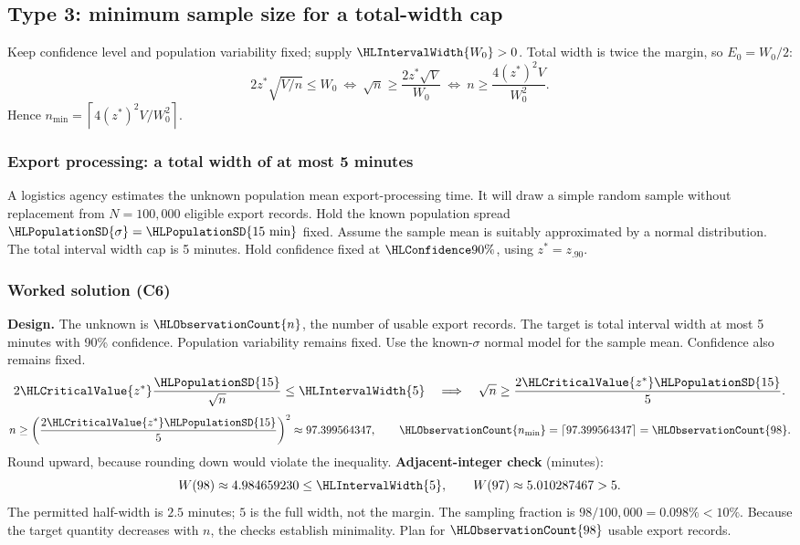 \clearpage
\subsection{Type 3: minimum sample size for a total-width cap}\label{prob:t3}
Keep confidence level and population variability fixed; supply $\HLIntervalWidth{W_0}>0$. Total width is twice the margin, so $E_0=W_0/2$:
\[
2z^*\sqrt{V/n}\le W_0
\ \Longleftrightarrow\ \sqrt n\ge\frac{2z^*\sqrt V}{W_0}
\ \Longleftrightarrow\ n\ge\frac{4(z^*)^2V}{W_0^2}.
\]
Hence $n_{\min}=\left\lceil4(z^*)^2V/W_0^2\right\rceil$.
\medskip
\subsubsection{Export processing: a total width of at most 5 minutes}\label{prob:t3-mean}
A logistics agency estimates the unknown population mean export-processing time. It will draw a simple random sample without replacement from $N=100{,}000$ eligible export records. Hold the known population spread $\HLPopulationSD{\sigma}=\HLPopulationSD{15\text{ min}}$ fixed. Assume the sample mean is suitably approximated by a normal distribution. The total interval width cap is 5 minutes. Hold confidence fixed at $\HLConfidence{90\%}$, using $z^*=z_{.90}$. 
\subsubsection*{Worked solution (C6)}\label{sol:t3-mean}
\textbf{Design.} The unknown is $\HLObservationCount{n}$, the number of usable export records. The target is total interval width at most 5 minutes with 90\% confidence. Population variability remains fixed. Use the known-$\sigma$ normal model for the sample mean. Confidence also remains fixed. 
\[
2\HLCriticalValue{z^*}\frac{\HLPopulationSD{15}}{\sqrt n}\le \HLIntervalWidth{5}\quad\Longrightarrow\quad\sqrt n\ge\frac{2\HLCriticalValue{z^*}\HLPopulationSD{15}}{5}.
\]
\[n\ge\left(\frac{2\HLCriticalValue{z^*}\HLPopulationSD{15}}{5}\right)^2\approx97.399564347,\qquad \HLObservationCount{n_{\min}}=\left\lceil 97.399564347\right\rceil=\HLObservationCount{98}.\]
Round upward, because rounding down would violate the inequality.
\textbf{Adjacent-integer check} (minutes):
\[ W(98)\approx4.984659230\le \HLIntervalWidth{5},\qquad W(97)\approx5.010287467>5.\]
The permitted half-width is $2.5$ minutes; $5$ is the full width, not the margin. The sampling fraction is $98/100{,}000=0.098\%<10\%$. Because the target quantity decreases with $n$, the checks establish minimality. Plan for $\HLObservationCount{98}$ usable export records. 
\clearpage
